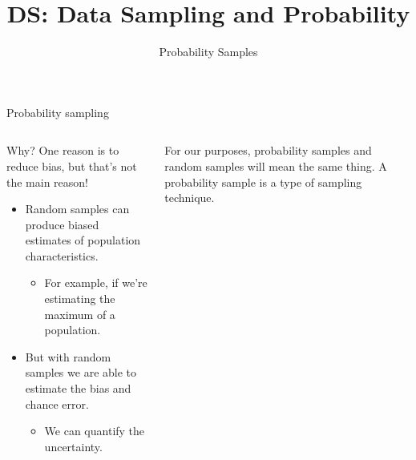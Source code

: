 \documentclass[aspectratio=169]{../latex_main/tntbeamer}  %
\title[Introduction]{DS: Data Sampling and Probability}
\subtitle{Probability Samples}
\begin{document}
	
	\maketitle
		\begin{frame}{Probability sampling}
	    \begin{columns}
	        \begin{column}{.4\textwidth}
	            Why? One reason is to reduce bias, but that’s not the main reason!
	            \begin{itemize}
	                \item Random samples can produce biased estimates of population characteristics.
	                \begin{itemize}
	                    \item For example, if we’re estimating the maximum of a population.
	                \end{itemize}
	                \item But with random samples we are able to estimate the bias and chance error.
	                \begin{itemize}
	                    \item We can quantify the uncertainty.
	                \end{itemize}
	            \end{itemize}
	        \end{column}
	        
	        \begin{column}{.5\textwidth}
	            For our purposes, probability samples and random samples will mean the same thing.
	            \bigskip
	            A probability sample is a type of sampling technique.
	        \end{column}
	        
	    \end{columns}
	    
	\end{frame}
	
\end{document}
